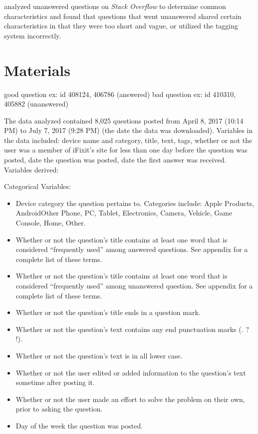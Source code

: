 \documentclass{article}
\begin{document}
\citep{Asaduzzaman2013} analyzed unanswered questions on \textit{Stack Overflow} to determine common characteristics and found that questions that went unanswered shared certain characteristics in that they were too short and vague, or utilized the tagging system incorrectly. 


\section*{Materials}

good question ex: id 408124, 406786 (answered)
bad question ex: id 410310, 405882 (unanswered) 

The data analyzed contained 8,025 questions posted from April 8, 2017 (10:14 PM) to July 7, 2017 (9:28 PM) (the date the data was downloaded). Variables in the data included: device name and category, title, text, tags, whether or not the user was a member of iFixit's site for less than one day before the question was posted, date the question was posted, date the first answer was received. Variables derived: 

Categorical Variables: 

\begin{itemize}
  \item Device category the question pertains to. Categories include: Apple Products, Android\/Other Phone, PC, Tablet, Electronics, Camera, Vehicle, Game Console, Home, Other.
  \item Whether or not the question's title contains at least one word that is considered ``frequently used'' among answered questions. See appendix for a complete list of these terms. 
  \item Whether or not the question's title contains at least one word that is considered ``frequently used'' among unanswered question. See appendix for a complete list of these terms. 
  \item Whether or not the question's title ends in a question mark.
  \item Whether or not the question's text contains any end punctuation marks (. ? !). 
  \item Whether or not the question's text is in all lower case. 
  \item Whether or not the user edited or added information to the question's text sometime after posting it.
  \item Whether or not the user made an effort to solve the problem on their own, prior to asking the question.
  \item Day of the week the question was posted. 
\end{itemize}
\end{document}
